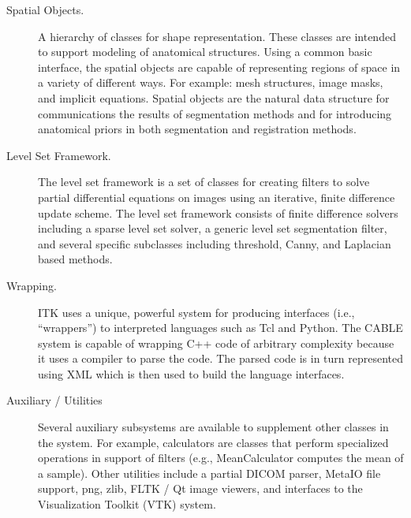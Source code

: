 \begin{description}
	\item[Spatial Objects.] A hierarchy of classes for shape representation. 
        These classes are intended to support modeling of anatomical
        structures. Using a common basic interface, the spatial objects are 
        capable of representing regions of space in a variety of different 
        ways. For example: mesh structures, image masks, and implicit equations.
        Spatial objects are the natural data structure for communications the 
        results of segmentation methods and for introducing anatomical priors 
        in both segmentation and registration methods.

	\item[Level Set Framework.] The level set framework is a set of
        classes for creating filters to solve partial differential equations
        on images using an iterative, finite difference update scheme. The
        level set framework consists of finite difference solvers including a
        sparse level set solver, a generic level set segmentation filter, and
        several specific subclasses including threshold, Canny, and Laplacian
        based methods.

	\item[Wrapping.] ITK uses a unique, powerful system for producing
        interfaces (i.e., ``wrappers'') to interpreted languages such as Tcl
        and Python. The CABLE system is capable of wrapping C++ code of
        arbitrary complexity because it uses a compiler to parse the code.
        The parsed code is in turn represented using XML which is then
        used to build the language interfaces.

	\item[Auxiliary / Utilities] Several auxiliary subsystems are 
        available to supplement other classes in the system. For example,
        calculators are classes that perform specialized operations in
        support of filters (e.g., MeanCalculator computes the mean of a
        sample). Other utilities include a partial DICOM parser, MetaIO file
        support, png, zlib, FLTK / Qt image viewers, and interfaces to the
        Visualization Toolkit (VTK) system.
        
\end{description}



